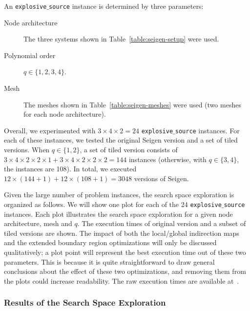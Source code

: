 An {\tt explosive$\_$source} instance is determined by three parameters:

\begin{description}
\item[Node architecture] The three systems shown in Table~\ref{table:seigen-setup} were used.
\item[Polynomial order] $q \in \lbrace 1, 2, 3, 4\rbrace$.
\item[Mesh] The meshes shown in Table~\ref{table:seigen-meshes} were used (two meshes for each node architecture).
\end{description}

Overall, we experimented with $3 \times 4 \times 2 = 24$ {\tt explosive$\_$source} instances. For each of these instances, we tested the original Seigen version and a set of tiled versions. When $q \in \lbrace 1, 2 \rbrace$, a set of tiled version consists of $3 \times 4 \times 2 \times 2 \times 1 + 3 \times 4 \times 2 \times 2 \times 2 = 144$ instances (otherwise, with $q \in \lbrace 3, 4 \rbrace$, the instances are 108). In total, we executed $12 \times (144 + 1) + 12 \times (108 + 1) = 3048$ versions of Seigen. 

Given the large number of problem instances, the search space exploration is organized as follows. We will show one plot for each of the 24 {\tt explosive$\_$source} instances. Each plot illustrates the search space exploration for a given node architecture, mesh and $q$. The execution times of original version and a subset of tiled versions are shown. The impact of both the local/global indirection maps and the extended boundary region optimizations will only be discussed qualitatively; a plot point will represent the best execution time out of these two parameters. This is because it is quite straightforward to draw general conclusions about the effect of these two optimizations, and removing them from the plots could increase readability. The raw execution times are available at~\cite{seigen-times-raw-values}.

\subsubsection{Results of the Search Space Exploration}

